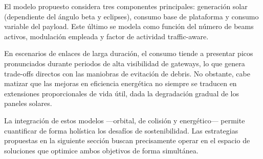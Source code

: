 El modelo propuesto considera tres componentes principales: generación solar (dependiente del ángulo beta y eclipses), consumo base de plataforma y consumo variable del payload. Este último se modela como función del número de beams activos, modulación empleada y factor de actividad traffic-aware. 

En escenarios de enlaces de larga duración, el consumo tiende a presentar picos pronunciados durante periodos de alta visibilidad de gateways, lo que genera trade-offs directos con las maniobras de evitación de debris. No obstante, cabe matizar que las mejoras en eficiencia energética no siempre se traducen en extensiones proporcionales de vida útil, dada la degradación gradual de los paneles solares.

La integración de estos modelos —orbital, de colisión y energético— permite cuantificar de forma holística los desafíos de sostenibilidad. Las estrategias propuestas en la siguiente sección buscan precisamente operar en el espacio de soluciones que optimice ambos objetivos de forma simultánea.